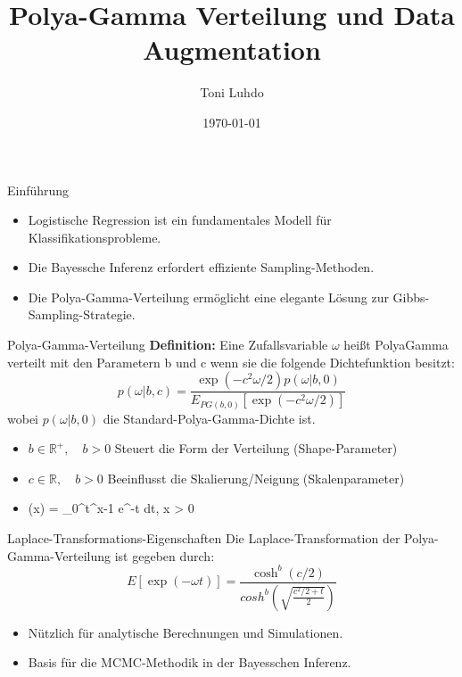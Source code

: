 \documentclass{beamer}
\title{Polya-Gamma Verteilung und Data Augmentation}
\author{Toni Luhdo}
\date{\today}
\begin{document}
	
	\frame{\titlepage}
	
	\begin{frame}{Einführung}
		\begin{itemize}
			\item Logistische Regression ist ein fundamentales Modell für Klassifikationsprobleme.
			\item Die Bayessche Inferenz erfordert effiziente Sampling-Methoden.
			\item Die Polya-Gamma-Verteilung ermöglicht eine elegante Lösung zur Gibbs-Sampling-Strategie.
		\end{itemize}
	\end{frame}
	
	\begin{frame}{Polya-Gamma-Verteilung}
		\textbf{Definition:} Eine Zufallsvariable $\omega$ heißt PolyaGamma verteilt mit den Parametern b und c wenn sie die folgende Dichtefunktion besitzt:
		\begin{equation}
			p(\omega | b, c) = \frac{\exp(-c^2 \omega /2) p(\omega | b, 0)}{E_{PG(b,0)}[\exp(-c^2 \omega /2)]}
		\end{equation}
		wobei $p(\omega | b, 0)$ die Standard-Polya-Gamma-Dichte ist.
		\begin{itemize}
			\item $b \in \mathbb{R}^{+}, \quad b > 0$ Steuert die Form der Verteilung (Shape-Parameter)
			\item $c \in \mathbb{R}, \quad b > 0$ Beeinflusst die Skalierung/Neigung (Skalenparameter)
			\item  \Gamma(x) = \int_0^\infty t^{x-1} e^{-t} dt, \quad {} x > 0
		\end{itemize}
	\end{frame}
	
	\begin{frame}{Laplace-Transformations-Eigenschaften}
		Die Laplace-Transformation der Polya-Gamma-Verteilung ist gegeben durch:
		\begin{equation}
			E[\exp(-\omega t)] =\frac{ \cosh^{b}(c/2)}{cosh^{b}(\sqrt{\frac{c^2/2+t}{2}})}
		\end{equation}
		\begin{itemize}
			\item Nützlich für analytische Berechnungen und Simulationen.
			\item Basis für die MCMC-Methodik in der Bayesschen Inferenz.
		\end{itemize}
	\end{frame}
\end{document}
